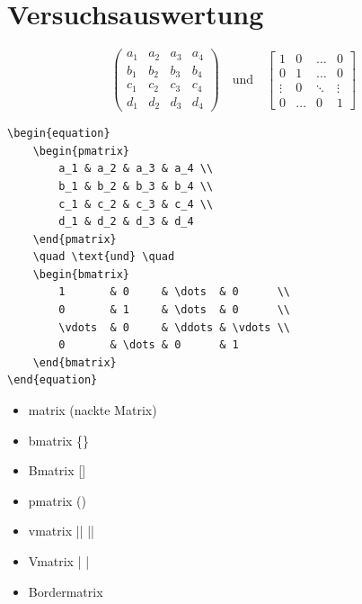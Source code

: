 \documentclass[12pt,a4paper]{scrartcl}
\begin{document}
\section{Versuchsauswertung}
\lipsum[1]
\begin{equation}
    \begin{pmatrix}
        a_1 & a_2 & a_3 & a_4 \\
        b_1 & b_2 & b_3 & b_4 \\
        c_1 & c_2 & c_3 & c_4 \\
        d_1 & d_2 & d_3 & d_4
    \end{pmatrix}
    \quad \text{und} \quad
    \begin{bmatrix}
        1       & 0     & \dots  & 0      \\
        0       & 1     & \dots  & 0      \\
        \vdots  & 0     & \ddots & \vdots \\
        0       & \dots & 0      & 1
    \end{bmatrix}
\end{equation}
\begin{Verbatim}[frame=single]
\begin{equation}
    \begin{pmatrix}
        a_1 & a_2 & a_3 & a_4 \\
        b_1 & b_2 & b_3 & b_4 \\
        c_1 & c_2 & c_3 & c_4 \\
        d_1 & d_2 & d_3 & d_4
    \end{pmatrix}
    \quad \text{und} \quad
    \begin{bmatrix}
        1       & 0     & \dots  & 0      \\
        0       & 1     & \dots  & 0      \\
        \vdots  & 0     & \ddots & \vdots \\
        0       & \dots & 0      & 1
    \end{bmatrix}
\end{equation}
\end{Verbatim}

\begin{itemize}
    \item matrix (nackte Matrix)
    \item bmatrix \{\}
    \item Bmatrix []
    \item pmatrix ()
    \item vmatrix || ||
    \item Vmatrix | |
    \item Bordermatrix
\end{itemize}
\end{document}
